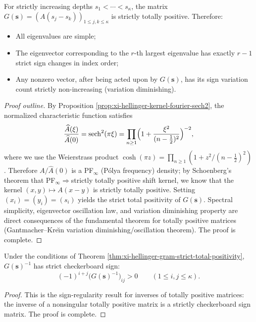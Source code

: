 \begin{theorem}\label{thm:xi-hellinger-gram-strict-total-positivity}
For strictly increasing depths \(s_1<\cdots<s_\kappa\), the matrix \(G(\mathbf s)=(A(s_j-s_k))_{1\le j,k\le\kappa}\) is strictly totally positive.
Therefore:
\begin{itemize}
\item All eigenvalues are simple;
\item The eigenvector corresponding to the \(r\)-th largest eigenvalue has exactly \(r-1\) strict sign changes in index order;
\item Any nonzero vector, after being acted upon by \(G(\mathbf s)\), has its sign variation count strictly non-increasing (variation diminishing).
\end{itemize}
\end{theorem}
\begin{proof}[Proof outline]
By Proposition \ref{prop:xi-hellinger-kernel-fourier-sech2}, the normalized characteristic function satisfies
\[
\frac{\widehat A(\xi)}{\widehat A(0)}=\mathrm{sech}^{2}(\pi\xi)
=\prod_{n\ge 1}\Bigl(1+\frac{\xi^{2}}{(n-\tfrac12)^{2}}\Bigr)^{-2},
\]
where we use the Weierstrass product \(\cosh(\pi z)=\prod_{n\ge 1}(1+z^{2}/(n-\tfrac12)^{2})\).
Therefore \(A/\widehat A(0)\) is a PF\(_\infty\) (P\'olya frequency) density; by Schoenberg's theorem that PF\(_\infty\)\(\Rightarrow\)strictly totally positive shift kernel, we know that the kernel \((x,y)\mapsto A(x-y)\) is strictly totally positive.
Setting \((x_i)=(y_i)=(s_i)\) yields the strict total positivity of \(G(\mathbf s)\).
Spectral simplicity, eigenvector oscillation law, and variation diminishing property are direct consequences of the fundamental theorem for totally positive matrices (Gantmacher--Kre\u{\i}n variation diminishing/oscillation theorem). The proof is complete.
\end{proof}

\begin{corollary}\label{cor:xi-hellinger-gram-inverse-checkerboard}
Under the conditions of Theorem \ref{thm:xi-hellinger-gram-strict-total-positivity}, \(G(\mathbf s)^{-1}\) has strict checkerboard sign:
\[
\boxed{\;
(-1)^{i+j}\bigl(G(\mathbf s)^{-1}\bigr)_{ij}>0\qquad(1\le i,j\le \kappa).\;}
\]
\end{corollary}
\begin{proof}
This is the sign-regularity result for inverses of totally positive matrices: the inverse of a nonsingular totally positive matrix is a strictly checkerboard sign matrix. The proof is complete.
\end{proof}

